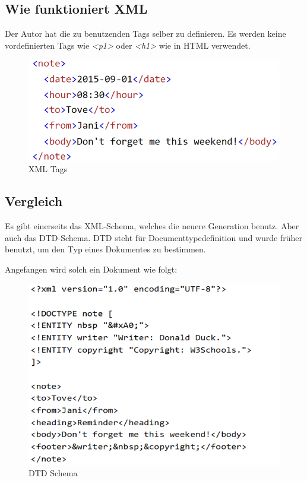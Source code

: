 \subsection{Wie funktioniert XML}

Der Autor hat die zu benutzenden Tags selber zu definieren. Es werden keine vordefinierten Tags wie \textit{<p1>} oder \textit{<h1>} wie in HTML verwendet.

\begin{figure}[htp]
    \author{Bozidar Spasenovic}
    \centering
    \includegraphics[scale=0.80]{pics/xml-tags.png}
    \caption{XML Tags}
    \label{fig:impl:XML-Tags}
\end{figure}   

\pagebreak
\subsection{Vergleich}
Es gibt einerseits das XML-Schema, welches die neuere Generation benutz. Aber auch das DTD-Schema.
DTD steht für Documenttypedefinition und wurde früher benutzt, um den Typ eines Dokumentes zu bestimmen.

Angefangen wird solch ein Dokument wie folgt:

\begin{figure}[htp]
    \author{Bozidar Spasenovic}
    \centering
    \includegraphics[scale=0.60]{pics/dtd-schema.png}
    \caption{DTD Schema}
    \label{fig:impl:DTD-Schema}
\end{figure}   


